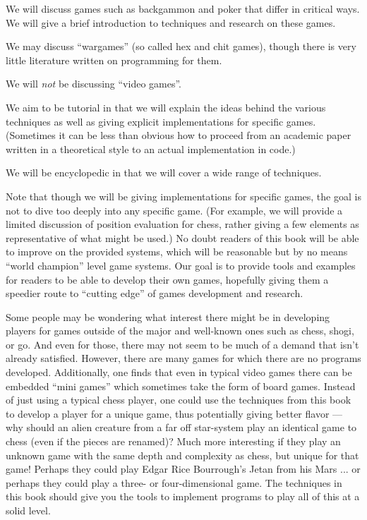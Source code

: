 \documentclass[10pt,dvipdfmx]{report}
\begin{document}
We will discuss games such as backgammon and poker that differ in critical ways.  We will give
a brief introduction to techniques and research on these games.

We may discuss ``wargames'' (so called hex and chit games), though there is very little
literature written on programming for them.

We will {\em not} be discussing ``video games''.

We aim to be tutorial in that we will explain the ideas behind the various techniques as well
as giving explicit implementations for specific games.  (Sometimes it can be less than obvious
how to proceed from an academic paper written in a theoretical style to an actual implementation
in code.)

We will be encyclopedic in that we will cover a wide range of techniques.

Note that though we will be giving implementations for specific games, the goal is not to
dive too deeply into any specific game.  (For example, we will provide a limited discussion of
position evaluation for chess, rather giving a few elements as representative of what might
be used.)  No doubt readers of this book will be able to improve on the provided systems, which will
be reasonable but by no means ``world champion'' level game systems.  Our goal is to provide
tools and examples for readers to be able to develop their own games, hopefully giving them
a speedier route to ``cutting edge'' of games development and research.

Some people may be wondering what interest there might be in developing players for
games outside of the major and well-known ones such as chess, shogi, or go.  And even for those,
there may not seem to be much of a demand that isn't already satisfied.
However, there are many games for which there are no programs developed.
Additionally, one finds that even in typical video games there can be embedded ``mini games''
which sometimes take the form of board games.  Instead of just using a typical chess player,
one could use the techniques from this book to develop a player for a unique game,
thus potentially giving better flavor --- why should an alien creature from a far off star-system
play an identical game to chess (even if the pieces are renamed)?  Much more interesting if
they play an unknown game with the same depth and complexity as chess, but unique for that game!
Perhaps they could play Edgar Rice Bourrough's Jetan from his Mars ... or perhaps they could play
a three- or four-dimensional game.  The techniques in this book should give you the tools to implement
programs to play all of this at a solid level.
\end{document}
